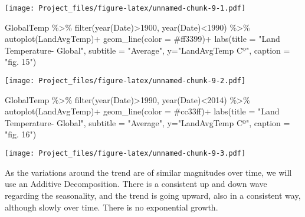 \documentclass[
]{article}
\newenvironment{Shaded}{\begin{snugshade}}{\end{snugshade}}
\newcommand{\AttributeTok}[1]{\textcolor[rgb]{0.77,0.63,0.00}{#1}}
\newcommand{\DecValTok}[1]{\textcolor[rgb]{0.00,0.00,0.81}{#1}}
\newcommand{\FunctionTok}[1]{\textcolor[rgb]{0.00,0.00,0.00}{#1}}
\newcommand{\NormalTok}[1]{#1}
\newcommand{\SpecialCharTok}[1]{\textcolor[rgb]{0.00,0.00,0.00}{#1}}
\newcommand{\StringTok}[1]{\textcolor[rgb]{0.31,0.60,0.02}{#1}}
\begin{document}
\texttt{[image: Project\_files/figure-latex/unnamed-chunk-9-1.pdf]}

\begin{Shaded}
\begin{Highlighting}[]
\NormalTok{GlobalTemp }\SpecialCharTok{\%\textgreater{}\%}
  \FunctionTok{filter}\NormalTok{(}\FunctionTok{year}\NormalTok{(Date)}\SpecialCharTok{\textgreater{}}\DecValTok{1900}\NormalTok{, }\FunctionTok{year}\NormalTok{(Date)}\SpecialCharTok{\textless{}}\DecValTok{1990}\NormalTok{) }\SpecialCharTok{\%\textgreater{}\%}
  \FunctionTok{autoplot}\NormalTok{(LandAvgTemp)}\SpecialCharTok{+}
  \FunctionTok{geom\_line}\NormalTok{(}\AttributeTok{color =} \StringTok{\textquotesingle{}\#ff3399\textquotesingle{}}\NormalTok{)}\SpecialCharTok{+}
  \FunctionTok{labs}\NormalTok{(}\AttributeTok{title =} \StringTok{"Land Temperature{-} Global"}\NormalTok{,}
       \AttributeTok{subtitle =} \StringTok{"Average"}\NormalTok{,}
       \AttributeTok{y=}\StringTok{"LandAvgTemp Cº"}\NormalTok{, }\AttributeTok{caption =} \StringTok{"fig. 15"}\NormalTok{)}
\end{Highlighting}
\end{Shaded}

\texttt{[image: Project\_files/figure-latex/unnamed-chunk-9-2.pdf]}

\begin{Shaded}
\begin{Highlighting}[]
\NormalTok{GlobalTemp }\SpecialCharTok{\%\textgreater{}\%}
  \FunctionTok{filter}\NormalTok{(}\FunctionTok{year}\NormalTok{(Date)}\SpecialCharTok{\textgreater{}}\DecValTok{1990}\NormalTok{, }\FunctionTok{year}\NormalTok{(Date)}\SpecialCharTok{\textless{}}\DecValTok{2014}\NormalTok{) }\SpecialCharTok{\%\textgreater{}\%}
  \FunctionTok{autoplot}\NormalTok{(LandAvgTemp)}\SpecialCharTok{+}
  \FunctionTok{geom\_line}\NormalTok{(}\AttributeTok{color =} \StringTok{\textquotesingle{}\#cc33ff\textquotesingle{}}\NormalTok{)}\SpecialCharTok{+}
  \FunctionTok{labs}\NormalTok{(}\AttributeTok{title =} \StringTok{"Land Temperature{-} Global"}\NormalTok{,}
       \AttributeTok{subtitle =} \StringTok{"Average"}\NormalTok{,}
       \AttributeTok{y=}\StringTok{"LandAvgTemp Cº"}\NormalTok{, }\AttributeTok{caption =} \StringTok{"fig. 16"}\NormalTok{)}
\end{Highlighting}
\end{Shaded}

\texttt{[image: Project\_files/figure-latex/unnamed-chunk-9-3.pdf]}

As the variations around the trend are of similar magnitudes over time,
we will use an Additive Decomposition. There is a consistent up and down
wave regarding the seasonality, and the trend is going upward, also in a
consistent way, although slowly over time. There is no exponential
growth.
\end{document}

